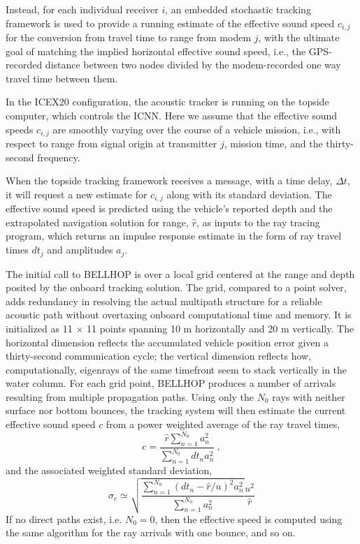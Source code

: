 Instead, for each individual receiver $i$, an embedded stochastic tracking framework is used to provide a running estimate of the effective sound speed $c_{i,j}$ for the conversion from travel time to range from modem $j$, with the ultimate goal of matching the implied horizontal effective sound speed, i.e., the GPS-recorded distance between two nodes divided by the modem-recorded one way travel time between them. 

 In the ICEX20 configuration, the acoustic tracker is running on the topside computer, which controls the ICNN.
Here we assume that the effective sound speeds $c_{i,j}$ are smoothly varying over the course of a vehicle mission, i.e., with respect to range from signal origin at transmitter $j$, mission time, and the thirty-second frequency.

 When the topside tracking framework receives a message, with a time delay, $\Delta t$, it will request a new estimate for $c_{i,j}$ along with its standard deviation.
The effective sound speed is predicted using the vehicle's reported depth and the extrapolated navigation solution for range, $\hat{r}$, as inputs to the ray tracing program, which returns an impulse response estimate in the form of ray travel times $dt_{j}$ and amplitudes $a_{j}$.

 The initial call to BELLHOP is over a local grid centered at the range and depth posited by the onboard tracking solution.
The grid, compared to a point solver, adds redundancy in resolving the actual multipath structure for a reliable acoustic path without overtaxing onboard computational time and memory.
It is initialized as 11 $\times$ 11 points spanning 10 m horizontally and 20 m vertically.
The horizontal dimension reflects the accumulated vehicle position error given a thirty-second communication cycle; the vertical dimension reflects how, computationally, eigenrays of the same timefront seem to stack vertically in the water column. 
For each grid point, BELLHOP produces a number of arrivals resulting from multiple propagation paths.
Using only the $N_0$ rays with neither surface nor bottom bounces, the tracking system will then estimate the current effective sound speed $c$ from a power weighted average of the ray travel times,
\begin{equation}
c = \frac{\hat{r} \sum_{n=1}^{N_{0}} a_{n}^{2}}{\sum_{n=1}^{N_{0}} dt_{n}a_{n}^{2}} ~, 
\end{equation}
and the associated weighted standard deviation,
\begin{equation}
\sigma_{c} \simeq \sqrt{\frac {\sum_{n=1}^{N_{0}} (dt_{n}-\hat{r}/u)^{2}a_{n}^{2}}{ \sum_{n=1}^{N_{0}} a_{n}^{2}} } \frac{u^{2}}{\hat{r}}
\end{equation}
If no direct paths exist, i.e. $N_{0}=0$, then the effective speed is computed using the same algorithm for the ray arrivals with one bounce, and so on.


